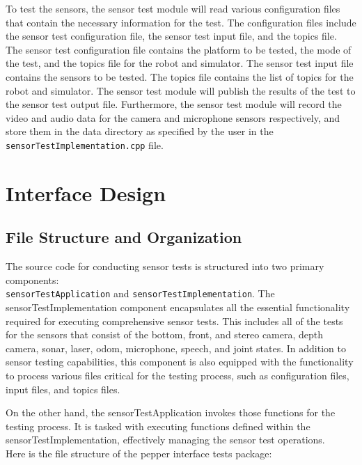 \documentclass{CSSRforAfrica}
\begin{document}
To test the sensors, the sensor test module will read various configuration files that contain the necessary information for the test.
The configuration files include the sensor test configuration file, the sensor test input file, and the topics file. The sensor test configuration file
contains the platform to be tested, the mode of the test, and the topics file for the robot and simulator. The sensor test input file contains the sensors to be tested.
The topics file contains the list of topics for the robot and simulator. The sensor test module will publish the results of the test to the sensor test output file.
Furthermore, the sensor test module will record the video and audio data for the camera and microphone sensors respectively, and store them in the data directory as specified 
by the user in the \texttt{sensorTestImplementation.cpp} file.

\newpage

\section{Interface Design}
\subsection*{File Structure and Organization}
The source code for conducting sensor tests is structured into two primary components: \\
\texttt{sensorTestApplication} and 
\texttt{sensorTestImplementation}. The sensorTestImplementation component encapsulates all the essential functionality 
required for executing comprehensive sensor tests. This includes all of the tests for the sensors that 
consist of the bottom, front, and stereo camera, depth camera, sonar, laser, odom, microphone, speech, and joint states. 
In addition to sensor testing capabilities, this component is also equipped with the functionality to process various files 
critical for the testing process, such as configuration files, input files, and topics files.

On the other hand, the sensorTestApplication invokes those functions for the testing process. It is tasked with 
executing functions defined within the sensorTestImplementation, effectively managing the sensor test operations.\\

Here is the file structure of the pepper interface tests package:
\vspace{0.5cm}

\renewcommand*\DTstyle{\ttfamily}
\end{document}
